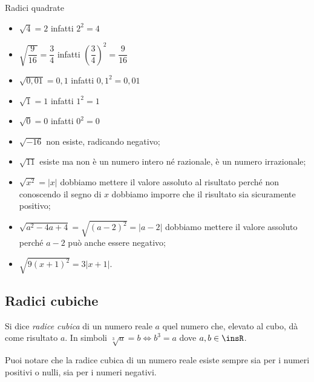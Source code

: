 \begin{esempio}
Radici quadrate
 \begin{multicols}{2}
\begin{itemize}
\item $\sqrt 4=2$ infatti $2^2=4$
\item $\sqrt{\dfrac 9{16}}=\dfrac 3 4$ infatti $\left(\dfrac 3 4\right)^2=
  \dfrac 9{16}$
\item $\sqrt{0,01}=0,1$ infatti $0,1^2=0,01$
\item $\sqrt 1=1$ infatti $1^2=1$
\item $\sqrt 0=0$ infatti $0^2=0$
\item $\sqrt{-16}$ non esiste, radicando negativo;
\item $\sqrt{11}$ esiste ma non è un numero intero né razionale, 
  è un numero irrazionale;
\item $\sqrt{x^2}=\left|x\right|$ dobbiamo mettere il valore assoluto 
  al risultato perché non conoscendo il segno di $x$ dobbiamo imporre che 
  il risultato sia sicuramente positivo;
\item $\sqrt{a^2-4a+4}=\sqrt{(a-2)^2}=\left|a-2\right|$ dobbiamo mettere 
  il valore assoluto perché $a-2$ può anche essere negativo;
\item $\sqrt{9(x+1)^2}=3\left|x+1\right|$.
\end{itemize}
\end{multicols}
\end{esempio}

\subsection{Radici cubiche}

\begin{definizione}
 Si dice \emph{radice cubica} di un numero reale $a$ quel numero che, 
 elevato al cubo, dà come risultato $a$. 
 In simboli $\sqrt[3]a=b \Leftrightarrow b^3=a$ dove $a,b\in \insR$.
\end{definizione}

Puoi notare che la radice cubica di un numero reale esiste sempre sia per 
i numeri positivi o nulli, sia per i numeri negativi.

